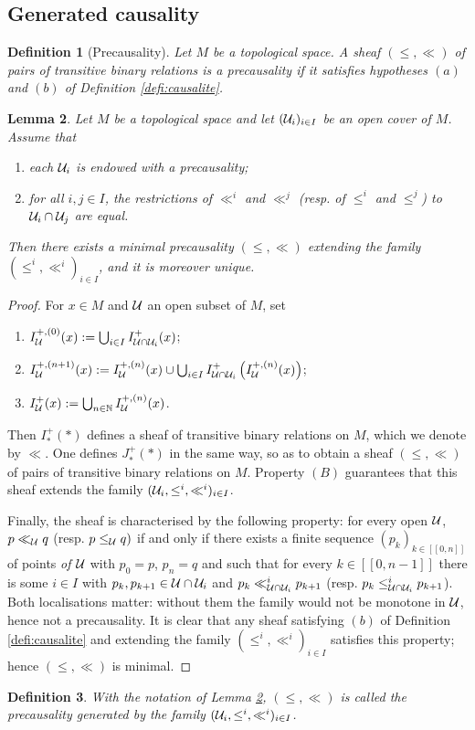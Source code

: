 \documentclass[a4paper,twoside]{article}
\providecommand{\lsem}{[\![}
\providecommand{\rsem}{]\!]}
\newtheorem{lem}{Lemma}[section]
\newtheorem{defi}[lem]{Definition}
\begin{document}
\subsection{Generated causality}
\begin{defi}[Precausality]
Let $M$ be a topological space. A sheaf $(\leq,\ll)$ of pairs of transitive binary relations is a precausality if it satisfies hypotheses $(a)$ and $(b)$ of Definition \ref{defi:causalite}.
\end{defi}
\begin{lem}\label{lem:union_causalite} Let $M$ be a topological space and let $(\mathcal{U}_i)_{i\in I}$ be an open cover of $M$.
Assume that
\begin{enumerate}[label=(\Alph*)]
\item each $\mathcal{U}_i$ is endowed with a precausality;
\item for all $i,j\in I$, the restrictions of $\ll^i$ and $\ll^j$ (resp. of $\leq^i$ and $\leq^j$) to $\mathcal{U}_i\cap \mathcal{U}_j$ are equal.
\end{enumerate}
Then there exists a minimal precausality $(\leq,\ll)$ extending the family $(\leq^i,\ll^i)_{i\in I}$, and it is moreover unique.
\end{lem}
\begin{proof}
For $x\in M$ and $\mathcal{U}$ an open subset of $M$, set
\begin{enumerate}
\item $I^{+,(0)}_{\mathcal{U}}(x):=\bigcup_{i\in I} I^+_{\mathcal{U}\cap \mathcal{U}_i} (x)$;
\item $I^{+,(n+1)}_{\mathcal{U}}(x):=I^{+,(n)}_{\mathcal{U}}(x)\cup \bigcup_{i\in I} I^+_{\mathcal{U}\cap \mathcal{U}_i}\left(I^{+,(n)}_{\mathcal{U}}(x) \right)$;
\item $I^+_{\mathcal{U}}(x):=\bigcup_{n\in \mathbb{N}} I^{+,(n)}_{\mathcal{U}}(x) $.
\end{enumerate}
Then $I^+_{*}(*)$ defines a sheaf of transitive binary relations on $M$, which we denote by $\ll$.
One defines $J^+_{*}(*)$ in the same way, so as to obtain a sheaf $(\leq,\ll)$ of pairs of transitive binary relations on $M$.
Property $(B)$ guarantees that this sheaf extends the family $(\mathcal{U}_i,\leq^i,\ll^i)_{i\in I}$.

Finally, the sheaf is characterised by the following property: for every open $\mathcal{U}$,
$p\ll_{\mathcal{U}} q$ (resp. $p\leq_{\mathcal{U}} q)$ if and only if there exists a finite sequence
$(p_k)_{k\in \lsem 0,n\rsem}$ of points \emph{of $\mathcal{U}$} with $p_0=p$, $p_n=q$ and such that for every $k\in \lsem0,n-1 \rsem$ there is some $i\in I$ with
$p_k,p_{k+1}\in \mathcal{U}\cap \mathcal{U}_i$ and $p_k\ll^i_{\mathcal{U}\cap \mathcal{U}_i} p_{k+1}$ (resp. $p_k\leq^i_{\mathcal{U}\cap \mathcal{U}_i} p_{k+1}$).
Both localisations matter: without them the family would not be monotone in $\mathcal{U}$, hence not a precausality.
It is clear that any sheaf satisfying $(b)$ of Definition \ref{defi:causalite} and extending the family $(\leq^i,\ll^i)_{i\in I}$ satisfies this property; hence $(\leq,\ll)$ is minimal.
\end{proof}
\begin{defi} With the notation of Lemma \ref{lem:union_causalite}, $(\leq,\ll)$ is called the precausality generated by the family $(\mathcal{U}_i,\leq^i,\ll^i)_{i\in I}$.
\end{defi}
\end{document}
